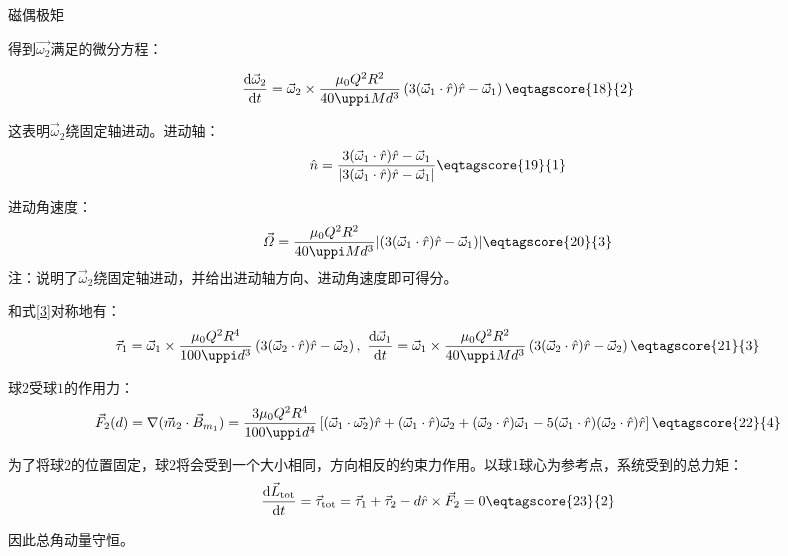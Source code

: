 \documentclass[answer]{cphos}
\begin{document}
\begin{problem}[50]{磁偶极矩}
\begin{solution}
得到\(\vec{\omega_2}\)满足的微分方程：

\begin{equation}
	\frac{\mathrm{d}\vec{\omega}_2}{\mathrm{d}t}=\vec{\omega}_2\times\frac{\mu_0 Q^2R^2}{40\uppi Md^3}\left(3(\vec{\omega}_1\cdot\hat{r})\hat{r}-\vec{\omega}_1\right)\eqtagscore{18}{2}\label{3}
\end{equation}

这表明\(\vec{\omega}_2\)绕固定轴进动。进动轴：
\begin{equation}
	\hat{n}=\frac{3(\vec{\omega}_1\cdot\hat{r})\hat{r}-\vec{\omega}_1}{\vert3(\vec{\omega}_1\cdot\hat{r})\hat{r}-\vec{\omega}_1\vert}\eqtagscore{19}{1}
\end{equation}

进动角速度：
\begin{equation}
\vec{\varOmega}=\frac{\mu_0 Q^2R^2}{40\uppi Md^3}\lvert\left(3(\vec{\omega}_1\cdot\hat{r})\hat{r}-\vec{\omega}_1\right)\rvert\eqtagscore{20}{3}
\end{equation}
注：说明了\(\vec{\omega}_2\)绕固定轴进动，并给出进动轴方向、进动角速度即可得分。

和式\ref{3}对称地有：
\begin{equation}
	\vec{\tau}_1=\vec{\omega}_1\times\frac{\mu_0 Q^2R^4}{100\uppi  d^3}\left(3(\vec{\omega}_2\cdot\hat{r})\hat{r}-\vec{\omega}_2\right),\ \frac{\mathrm{d}\vec{\omega}_1}{\mathrm{d}t}=\vec{\omega}_1\times\frac{\mu_0 Q^2R^2}{40\uppi M d^3}\left(3(\vec{\omega}_2\cdot\hat{r})\hat{r}-\vec{\omega}_2\right)\eqtagscore{21}{3}\label{4}
\end{equation}

球\(2\)受球\(1\)的作用力：
\begin{equation}
	\vec{F}_{2}(d)=\nabla(\vec{m}_2\cdot\vec{B}_{m_1})=\frac{3\mu_0 Q^2R^4}{100\uppi d^4}\left[(\vec{\omega}_1\cdot\vec{\omega_2})\hat{r}+(\vec{\omega}_1\cdot\hat{r})\vec{\omega}_2+(\vec{\omega}_2\cdot\hat{r})\vec{\omega}_1-5(\vec{\omega}_1\cdot\hat{r})(\vec{\omega}_2\cdot\hat{r})\hat{r}\right]\eqtagscore{22}{4}
\end{equation}

为了将球\(2\)的位置固定，球\(2\)将会受到一个大小相同，方向相反的约束力作用。以球\(1\)球心为参考点，系统受到的总力矩：
\begin{equation}
	\frac{\mathrm{d}\vec{L}_\text{tot}}{\mathrm{d}t}=\vec{\tau}_\text{tot}=\vec{\tau}_1+\vec{\tau}_2-d\hat{r}\times\vec{F}_2=0\eqtagscore{23}{2}
\end{equation}

因此总角动量守恒。


\end{solution}
\end{problem}
\end{document}
